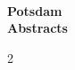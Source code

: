 \documentclass[%
  a4paper,
  pagesize,%
  1headlines,%
  8pt,%
  DIV=16,
  BCOR=12mm,
  twoside,
  smallheadings,
]{scrartcl}
\begin{document}
\sloppy


\thispagestyle{empty}
\begin{center}
\unilogo\\
\Huge\bf Potsdam\\ Abstracts \\
\end{center}


\begin{multicols}{2}

\end{multicols}{2}
\end{document}
